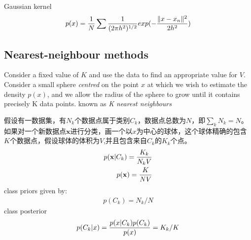 \documentclass[a4paper]{article}
\begin{document}
Gaussian kernel
\begin{align}
  p(x) = {1 \over N} \sum {1 \over (2 \pi h^2)^{1/2}} exp({- {\|x-x_n\|^2 \over 2h^2 }})
\end{align}

\subsection{Nearest-neighbour methods}
\label{sec:2.5.2}
Consider a ﬁxed value of $K$ and use the data to ﬁnd an appropriate value for $V$.
Consider a small sphere \emph{centred} on the point $x$ at which we wish to estimate the  density $p(x)$, and we allow the radius of the sphere to grow until it contains precisely K data points. known as \textit{K nearest neighbours}

假设有一数据集，有$N_k$个数据点属于类别$C_k$，数据点总数为$N$，即$\sum_k N_k = N$。如果对一个新数据点$\mathbf{x}$进行分类，画一个以$x$为中心的球体，这个球体精确的包含$K$个数据点，假设球体的体积为$V$,并且包含来自$C_k$的$K_k$个点。
\begin{align}
  p(\mathbf{x}|C_k) = {K_k \over N_kV}\\
  p(\mathbf{x}) = {K \over NV}
\end{align}
class priors given by:
\begin{align}
  p(C_k) = N_k/N
\end{align}
class posterior
\begin{align}
  p(C_k|x) = {p(x|C_k)p(C_k) \over p(x)} = K_k/K
\end{align}
\end{document}
